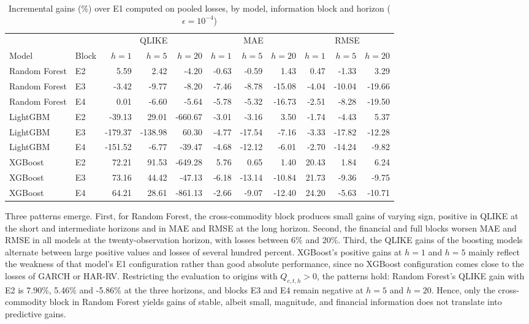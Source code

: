 \documentclass[a4paper,fleqn]{cas-sc}
\begin{document}
\begin{table}[t]
\centering
\caption{Incremental gains (\%) over E1 computed on pooled losses, by model, information block and horizon (\(\epsilon=10^{-4}\))}
\label{tab:ml_incremental_pooled}
\scriptsize
\setlength{\tabcolsep}{3pt}
\begin{tabular*}{\textwidth}{@{\extracolsep{\fill}}llrrrrrrrrr@{}}
\hline
 & & \multicolumn{3}{c}{QLIKE} & \multicolumn{3}{c}{MAE} & \multicolumn{3}{c}{RMSE} \\
Model & Block & \(h=1\) & \(h=5\) & \(h=20\) & \(h=1\) & \(h=5\) & \(h=20\) & \(h=1\) & \(h=5\) & \(h=20\) \\
\hline
Random Forest & E2 & 5.59 & 2.42 & -4.20 & -0.63 & -0.59 & 1.43 & 0.47 & -1.33 & 3.29 \\
Random Forest & E3 & -3.42 & -9.77 & -8.20 & -7.46 & -8.78 & -15.08 & -4.04 & -10.04 & -19.66 \\
Random Forest & E4 & 0.01 & -6.60 & -5.64 & -5.78 & -5.32 & -16.73 & -2.51 & -8.28 & -19.50 \\
LightGBM & E2 & -39.13 & 29.01 & -660.67 & -3.01 & -3.16 & 3.50 & -1.74 & -4.43 & 5.37 \\
LightGBM & E3 & -179.37 & -138.98 & 60.30 & -4.77 & -17.54 & -7.16 & -3.33 & -17.82 & -12.28 \\
LightGBM & E4 & -151.52 & -6.77 & -39.47 & -4.68 & -12.12 & -6.01 & -2.70 & -14.24 & -9.82 \\
XGBoost & E2 & 72.21 & 91.53 & -649.28 & 5.76 & 0.65 & 1.40 & 20.43 & 1.84 & 6.24 \\
XGBoost & E3 & 73.16 & 44.42 & -47.13 & -6.18 & -13.14 & -10.84 & 21.73 & -9.36 & -9.75 \\
XGBoost & E4 & 64.21 & 28.61 & -861.13 & -2.66 & -9.07 & -12.40 & 24.20 & -5.63 & -10.71 \\
\hline
\end{tabular*}
\end{table}

Three patterns emerge. First, for Random Forest, the cross-commodity block produces small gains of varying sign, positive in QLIKE at the short and intermediate horizons and in MAE and RMSE at the long horizon. Second, the financial and full blocks worsen MAE and RMSE in all models at the twenty-observation horizon, with losses between 6\% and 20\%. Third, the QLIKE gains of the boosting models alternate between large positive values and losses of several hundred percent. XGBoost's positive gains at \(h=1\) and \(h=5\) mainly reflect the weakness of that model's E1 configuration rather than good absolute performance, since no XGBoost configuration comes close to the losses of GARCH or HAR-RV. Restricting the evaluation to origins with \(Q_{c,t,h}>0\), the patterns hold: Random Forest's QLIKE gain with E2 is 7.90\%, 5.46\% and -5.86\% at the three horizons, and blocks E3 and E4 remain negative at \(h=5\) and \(h=20\). Hence, only the cross-commodity block in Random Forest yields gains of stable, albeit small, magnitude, and financial information does not translate into predictive gains.
\end{document}
